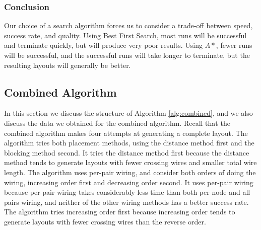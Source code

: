 \subsubsection{Conclusion}
Our choice of a search algorithm forces us to consider a trade-off between
speed, success rate, and quality.
Using Best First Search, most runs will be successful
and terminate quickly, but will produce very poor results. Using $A*$,
fewer runs will be successful, and the successful runs will take longer to
terminate, but the resulting layouts will generally be better.

\subsection{Combined Algorithm}
\label{sec:method_combination}

In this section we discuss the structure of Algorithm
\ref{alg:combined}, and we also
discuss the data we obtained for the combined algorithm. Recall that the combined
algorithm makes four attempts at generating a complete layout. The algorithm
tries both
placement methods, using the distance method first and the blocking method
second. It
tries the distance method first because the distance method tends to
generate layouts with fewer
crossing wires and smaller total wire length. The algorithm uses
per-pair wiring, and
consider both orders of doing the wiring, increasing order first and decreasing
order second. It uses per-pair wiring because per-pair wiring takes considerably
less time than both per-node and all pairs wiring, and neither of the other
wiring methods has a better success rate. The algorithm tries increasing order
first because increasing order tends to generate layouts with fewer crossing
wires than the reverse order.

